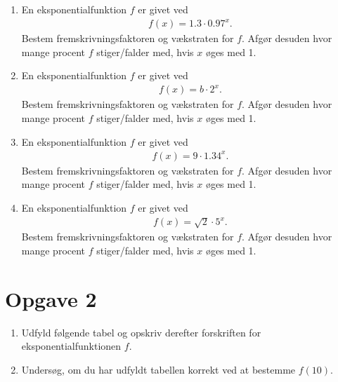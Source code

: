 \begin{enumerate}[label=\roman*)]
	\item En eksponentialfunktion $f$ er givet ved
	\begin{align*}
		f(x) = 1.3\cdot 0.97^x.
	\end{align*}
	Bestem fremskrivningsfaktoren og vækstraten for $f$. Afgør desuden hvor mange procent $f$ stiger/falder med, hvis $x$ øges med 1.
	\item En eksponentialfunktion $f$ er givet ved
	\begin{align*}
		f(x) = b\cdot 2^x.
	\end{align*}
	Bestem fremskrivningsfaktoren og vækstraten for $f$. Afgør desuden hvor mange procent $f$ stiger/falder med, hvis $x$ øges med 1.
	\item En eksponentialfunktion $f$ er givet ved
	\begin{align*}
		f(x) = 9\cdot 1.34^x.
	\end{align*}
	Bestem fremskrivningsfaktoren og vækstraten for $f$. Afgør desuden hvor mange procent $f$ stiger/falder med, hvis $x$ øges med 1.
	\item En eksponentialfunktion $f$ er givet ved
	\begin{align*}
		f(x) = \sqrt{2}\cdot 5^x.
	\end{align*}
	Bestem fremskrivningsfaktoren og vækstraten for $f$. Afgør desuden hvor mange procent $f$ stiger/falder med, hvis $x$ øges med 1.
\end{enumerate}

\section*{Opgave 2}
\begin{enumerate}[label=\roman*)]
	\item Udfyld følgende tabel og opskriv derefter forskriften for eksponentialfunktionen $f$.
	\item Undersøg, om du har udfyldt tabellen korrekt ved at bestemme $f(10)$. 
\end{enumerate}

\begin{center}
\end{center}

